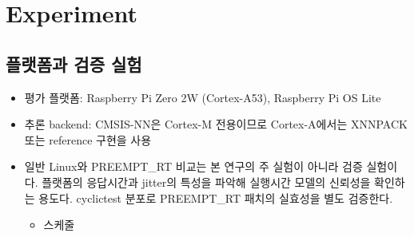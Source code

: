 \documentclass[10pt]{article}
\begin{document}
\section{Experiment}
\subsection{플랫폼과 검증 실험}
\begin{itemize}
\item 평가 플랫폼: Raspberry Pi Zero 2W (Cortex-A53), Raspberry Pi OS Lite
\item 추론 backend: CMSIS-NN은 Cortex-M 전용이므로 Cortex-A에서는 XNNPACK 또는 reference 구현을 사용
\item 일반 Linux와 PREEMPT\_RT 비교는 본 연구의 주 실험이 아니라 검증 실험이다. 플랫폼의 응답시간과 jitter의 특성을 파악해 실행시간 모델의 신뢰성을 확인하는 용도다. cyclictest 분포로 PREEMPT\_RT 패치의 실효성을 별도 검증한다.
\begin{itemize}
\item 스케줄
\end{itemize}
\end{itemize}
\end{document}
